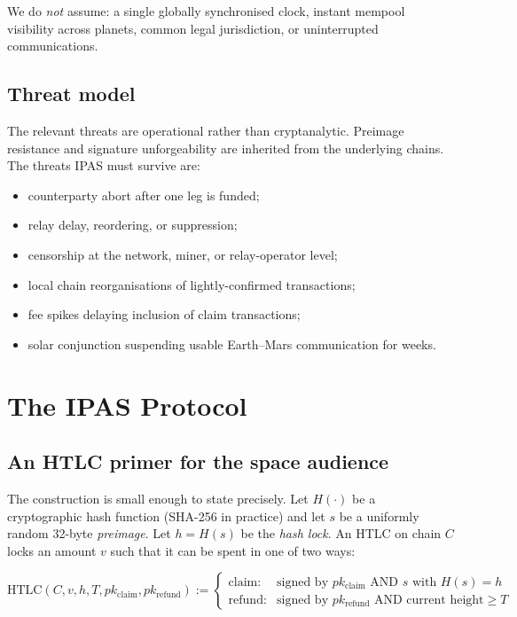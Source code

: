 \documentclass[11pt]{article}
\begin{document}
We do \emph{not} assume: a single globally synchronised clock, instant mempool visibility across planets, common legal jurisdiction, or uninterrupted communications.

\subsection{Threat model}

The relevant threats are operational rather than cryptanalytic. Preimage resistance and signature unforgeability are inherited from the underlying chains. The threats IPAS must survive are:
\begin{itemize}
  \item counterparty abort after one leg is funded;
  \item relay delay, reordering, or suppression;
  \item censorship at the network, miner, or relay-operator level;
  \item local chain reorganisations of lightly-confirmed transactions;
  \item fee spikes delaying inclusion of claim transactions;
  \item solar conjunction suspending usable Earth--Mars communication for weeks.
\end{itemize}

\section{The IPAS Protocol}
\label{sec:ipas}

\subsection{An HTLC primer for the space audience}

The construction is small enough to state precisely. Let $H(\cdot)$ be a cryptographic hash function (SHA-256 in practice) and let $s$ be a uniformly random 32-byte \emph{preimage}. Let $h = H(s)$ be the \emph{hash lock}. An HTLC on chain $C$ locks an amount $v$ such that it can be spent in one of two ways:

\begin{equation}
\text{HTLC}(C, v, h, T, pk_{\text{claim}}, pk_{\text{refund}}) :=
\begin{cases}
  \text{claim:} & \text{signed by } pk_{\text{claim}} \text{ AND } s \text{ with } H(s) = h \\
  \text{refund:} & \text{signed by } pk_{\text{refund}} \text{ AND current height} \geq T
\end{cases}
\label{eq:htlc}
\end{equation}
\end{document}
